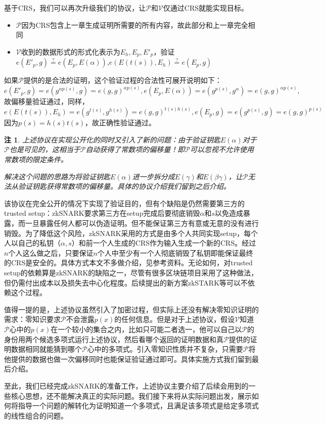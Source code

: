 \documentclass[12pt]{article}
\newcommand{\zk}{zkSNARK}
\newcommand{\pp}{$\mathcal{P}$}
\newcommand{\vv}{$\mathcal{V}$}
\newtheorem{remark}{注}[section]
\begin{document}
基于CRS，我们可以再次升级我们的协议，让\pp 和\vv 仅通过CRS就能实现目标。
\begin{itemize}
	\item \pp 因为CRS包含上一章生成证明所需要的所有内容，故此部分和上一章完全相同
	\item \vv 收到的数据形式的形式化表示为$E_h,E_p,E'_p$，验证\\$e(E'_p,g)\overset{?}{=} e(E_p,E(\alpha))$,$e(E(t(s)),E_h) \overset{?}{=} e(E_p,g)$
\end{itemize}
如果\pp 提供的是合法的证明，这个验证过程的合法性可展开说明如下：
$$e(E'_p,g) = e(g^{\alpha p(s)},g)=e(g,g)^{\alpha p(s)}, e(E_p,E(\alpha))=e(g^{p(s)},g^\alpha)=e(g,g)^{\alpha p(s)},$$
故偏移量验证通过，同样，
$$e(E(t(s)),E_h)=e(g^{t(s)},g^{h(s)})=e(g,g)^{t(s)h(s)}, e(E_p,g)=e(g^{p(s)},g)=e(g,g)^{p(s)}$$
因为$p(s)=h(s)t(s)$，故正确性验证通过。
\begin{remark}
\label{shift}
	上述协议在实现公开化的同时又引入了新的问题：由于验证钥匙$E(\alpha)$对于\pp 也是可见的，这相当于\pp 自动获得了常数项的偏移量！即\pp 可以忽视不允许使用常数项的限定条件。
	
	解决这个问题的思路为将验证钥匙$E(\alpha)$进一步拆分成$E(\gamma)$和$E(\beta\gamma)$，让\pp 无法从验证钥匙获得常数项的偏移量。具体的协议介绍我们留到之后介绍。
\end{remark}
该协议在完全公开的情况下实现了验证目的，但有个缺陷是仍然需要第三方的trusted setup：\zk 要求第三方在setup完成后要彻底销毁$\alpha$和$s$以免造成暴露，而一旦暴露任何人都可以伪造证明。但不能保证第三方有意或无意的没有进行销毁。为了降低这个风险，\zk 采用的方式是由多个人共同实现setup，每个人以自己的私钥（$\alpha,s$）和前一个人生成的CRS作为输入生成一个新的CRS。经过$n$个人这么做之后，只要保证$n$个人中至少有一个人彻底销毁了私钥即能保证最终的CRS是安全的。具体方式本文不多做介绍，见参考资料。无论如何，对trusted setup的依赖算是\zk 的缺陷之一，尽管有很多区块链项目采用了这种做法，但仍需付出成本以及损失去中心化程度。后续提出的新方案zkSTARK等可以不依赖这个过程。

值得一提的是，上述协议虽然引入了加密过程，但实际上还没有解决零知识证明的需求：零知识要求\pp 不会泄露$p(x)$的任何信息。但是对于上述协议，假设\vv 知道\pp 心中的$p(x)$在一个较小的集合之内，比如只可能二者选一，他可以自己以\pp 的身份用两个候选多项式运行上述协议，然后看哪个返回的证明数据和真\pp 提供的证明数据相同就能猜到哪个\pp 心中的多项式。引入零知识性质并不复杂，只需要\pp 将他提供的数据也做一次偏移同时也能保证验证通过即可。具体实施方式我们留到最后介绍。

至此，我们已经完成\zk 的准备工作，上述协议主要介绍了后续会用到的一些核心思想，还不能解决真正的实际问题。我们接下来将从实际问题出发，展示如何将指导一个问题的解转化为证明知道一个多项式，且满足该多项式是给定多项式的线性组合的问题。
\end{document}
